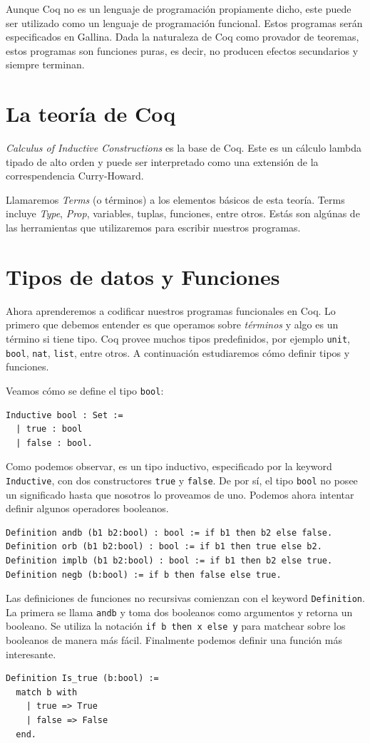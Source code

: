 Aunque Coq no es un lenguaje de programación propiamente dicho, este puede ser utilizado como un lenguaje de programación funcional. Estos programas serán especificados en Gallina. Dada la naturaleza de Coq como provador de teoremas, estos programas son funciones puras, es decir, no producen efectos secundarios y siempre terminan.

\section{La teoría de Coq}

\textit{Calculus of Inductive Constructions} es la base de Coq. Este es un cálculo lambda tipado de alto orden y puede ser interpretado como una extensión de la correspendencia Curry-Howard.

Llamaremos \textit{Terms} (o términos) a los elementos básicos de esta teoría. Terms incluye \textit{Type}, \textit{Prop}, variables, tuplas, funciones, entre otros. Estás son algúnas de las herramientas que utilizaremos para escribir nuestros programas.


\section{Tipos de datos y Funciones}

Ahora aprenderemos a codificar nuestros programas funcionales en Coq. Lo primero que debemos entender es que operamos sobre \textit{términos} y algo es un término si tiene tipo. Coq provee muchos tipos predefinidos, por ejemplo \lstinline{unit}, \lstinline{bool}, \lstinline{nat}, \lstinline{list}, entre otros. A continuación estudiaremos cómo definir tipos y funciones.

Veamos cómo se define el tipo \lstinline{bool}:
\begin{lstlisting}
Inductive bool : Set :=
  | true : bool
  | false : bool.
\end{lstlisting}
Como podemos observar, es un tipo inductivo, especificado por la keyword \lstinline{Inductive}, con dos constructores \lstinline{true} y \lstinline{false}. De por sí, el tipo \lstinline{bool} no posee un significado hasta que nosotros lo proveamos de uno. Podemos ahora intentar definir algunos operadores booleanos.
\begin{lstlisting}
Definition andb (b1 b2:bool) : bool := if b1 then b2 else false.
Definition orb (b1 b2:bool) : bool := if b1 then true else b2.
Definition implb (b1 b2:bool) : bool := if b1 then b2 else true.
Definition negb (b:bool) := if b then false else true.
\end{lstlisting}
Las definiciones de funciones no recursivas comienzan con el keyword \lstinline{Definition}. La primera se llama \lstinline{andb} y toma dos booleanos como argumentos y retorna un booleano. Se utiliza la notación \lstinline{if b then x else y} para matchear sobre los booleanos de manera más fácil. Finalmente podemos definir una función más interesante.
\begin{lstlisting}
Definition Is_true (b:bool) :=
  match b with
    | true => True
    | false => False
  end.
\end{lstlisting}

